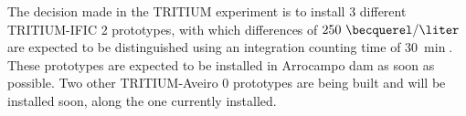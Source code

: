 The decision made in the TRITIUM experiment is to install 3 different TRITIUM-IFIC 2 prototypes, with which differences of $250~\becquerel/\liter$ are expected to be distinguished using an integration counting time of $30~\min$. These prototypes are expected to be installed  in Arrocampo dam as soon as possible. Two other TRITIUM-Aveiro 0 prototypes are being built and will be installed soon, along the one currently installed.





